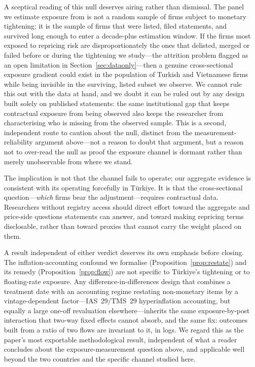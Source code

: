 \documentclass[review,12pt,authoryear]{elsarticle}
\theoremstyle{plain}
\theoremstyle{definition}
\begin{document}
A sceptical reading of this null deserves airing rather than dismissal. The
panel we estimate exposure from is not a random sample of firms subject to
monetary tightening; it is the sample of firms that were listed, filed
statements, and survived long enough to enter a decade-plus estimation window.
If the firms most exposed to repricing risk are disproportionately the ones
that delisted, merged or failed before or during the tightening we study---the
attrition problem flagged as an open limitation in
Section~\ref{sec:dataonly}---then a genuine cross-sectional exposure gradient
could exist in the population of Turkish and Vietnamese firms while being
invisible in the surviving, listed subset we observe. We cannot rule this out
with the data at hand, and we doubt it can be ruled out by any design built
solely on published statements: the same institutional gap that keeps
contractual exposure from being observed also keeps the researcher from
characterising who is missing from the observed sample. This is a second,
independent route to caution about the null, distinct from the measurement-
reliability argument above---not a reason to doubt that argument, but a reason
not to over-read the null as proof the exposure channel is dormant rather than
merely unobservable from where we stand.

The implication is not that the channel fails to operate; our aggregate evidence
is consistent with its operating forcefully in T\"{u}rkiye. It is that the
cross-sectional question---\emph{which} firms bear the adjustment---requires
contractual data. Researchers without registry access should direct effort
toward the aggregate and price-side questions statements can answer, and toward
making repricing terms disclosable, rather than toward proxies that cannot carry
the weight placed on them.

A result independent of either verdict deserves its own emphasis before
closing. The inflation-accounting confound we formalise
(Proposition~\ref{prop:restate}) and its remedy
(Proposition~\ref{prop:flow}) are not specific to T\"{u}rkiye's tightening or
to floating-rate exposure. Any difference-in-differences design that combines
a treatment date with an accounting regime restating non-monetary items by a
vintage-dependent factor---IAS~29/TMS~29 hyperinflation accounting, but
equally a large one-off revaluation elsewhere---inherits the same
exposure-by-post interaction that two-way fixed effects cannot absorb, and the
same fix: outcomes built from a ratio of two flows are invariant to it, in
logs. We regard this as the paper's most exportable methodological result,
independent of what a reader concludes about the exposure-measurement question
above, and applicable well beyond the two countries and the specific channel
studied here.
\end{document}
